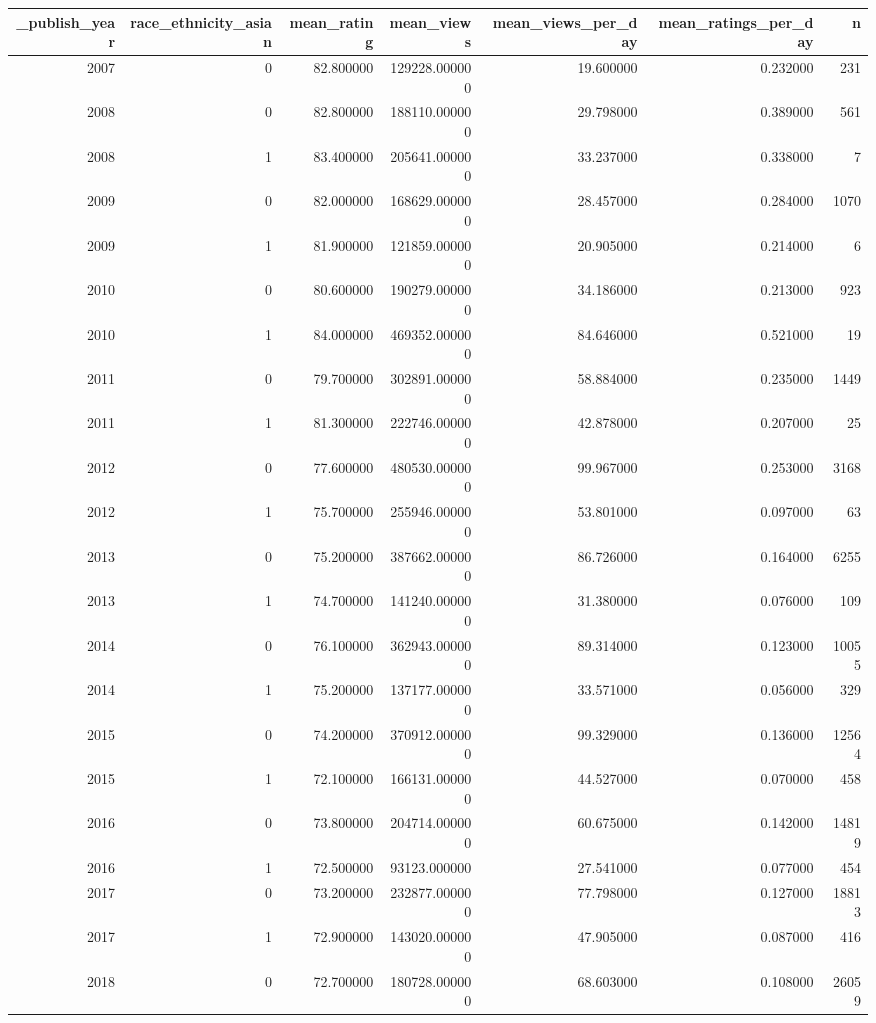 \begin{tabular}{rrrrrrr}
\toprule
_publish_year & race_ethnicity_asian & mean_rating & mean_views & mean_views_per_day & mean_ratings_per_day & n \\
\midrule
2007 & 0 & 82.800000 & 129228.000000 & 19.600000 & 0.232000 & 231 \\
2008 & 0 & 82.800000 & 188110.000000 & 29.798000 & 0.389000 & 561 \\
2008 & 1 & 83.400000 & 205641.000000 & 33.237000 & 0.338000 & 7 \\
2009 & 0 & 82.000000 & 168629.000000 & 28.457000 & 0.284000 & 1070 \\
2009 & 1 & 81.900000 & 121859.000000 & 20.905000 & 0.214000 & 6 \\
2010 & 0 & 80.600000 & 190279.000000 & 34.186000 & 0.213000 & 923 \\
2010 & 1 & 84.000000 & 469352.000000 & 84.646000 & 0.521000 & 19 \\
2011 & 0 & 79.700000 & 302891.000000 & 58.884000 & 0.235000 & 1449 \\
2011 & 1 & 81.300000 & 222746.000000 & 42.878000 & 0.207000 & 25 \\
2012 & 0 & 77.600000 & 480530.000000 & 99.967000 & 0.253000 & 3168 \\
2012 & 1 & 75.700000 & 255946.000000 & 53.801000 & 0.097000 & 63 \\
2013 & 0 & 75.200000 & 387662.000000 & 86.726000 & 0.164000 & 6255 \\
2013 & 1 & 74.700000 & 141240.000000 & 31.380000 & 0.076000 & 109 \\
2014 & 0 & 76.100000 & 362943.000000 & 89.314000 & 0.123000 & 10055 \\
2014 & 1 & 75.200000 & 137177.000000 & 33.571000 & 0.056000 & 329 \\
2015 & 0 & 74.200000 & 370912.000000 & 99.329000 & 0.136000 & 12564 \\
2015 & 1 & 72.100000 & 166131.000000 & 44.527000 & 0.070000 & 458 \\
2016 & 0 & 73.800000 & 204714.000000 & 60.675000 & 0.142000 & 14819 \\
2016 & 1 & 72.500000 & 93123.000000 & 27.541000 & 0.077000 & 454 \\
2017 & 0 & 73.200000 & 232877.000000 & 77.798000 & 0.127000 & 18813 \\
2017 & 1 & 72.900000 & 143020.000000 & 47.905000 & 0.087000 & 416 \\
2018 & 0 & 72.700000 & 180728.000000 & 68.603000 & 0.108000 & 26059 \\

\end{tabular}

